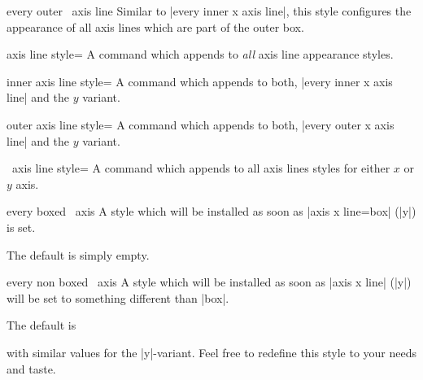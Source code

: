 \begin{pgfplotsxykey}{every outer \x\ axis line}
	Similar to |every inner x axis line|, this style configures the appearance of all axis lines which are part of the outer box.
\begin{codeexample}[]
\end{codeexample}
\end{pgfplotsxykey}

\label{pgfplots:page:axislines}
\begin{pgfplotskey}{axis line style=}
	A command which appends  to \emph{all} axis line appearance styles.
\end{pgfplotskey}

\begin{pgfplotskey}{inner axis line style=}
	A command which appends  to both, |every inner x axis line| and the $y$ variant.
\end{pgfplotskey}
\begin{pgfplotskey}{outer axis line style=}
	A command which appends  to both, |every outer x axis line| and the $y$ variant.
\end{pgfplotskey}
\begin{pgfplotsxykey}{\x\ axis line style=}
	A command which appends  to all axis lines styles for either $x$ or $y$ axis.
\end{pgfplotsxykey}

\begin{pgfplotsxykey}{every boxed \x\ axis}
	A style which will be installed as soon as |axis x line=box| (|y|) is set.

	The default is simply empty.
\end{pgfplotsxykey}
\begin{pgfplotsxykey}{every non boxed \x\ axis}
	A style which will be installed as soon as |axis x line| (|y|) will be set to something different than |box|. 
	
	The default is 
\begin{codeexample}
\end{codeexample}
	\noindent with similar values for the |y|-variant. Feel free to redefine this style to your needs and taste.
\end{pgfplotsxykey}

